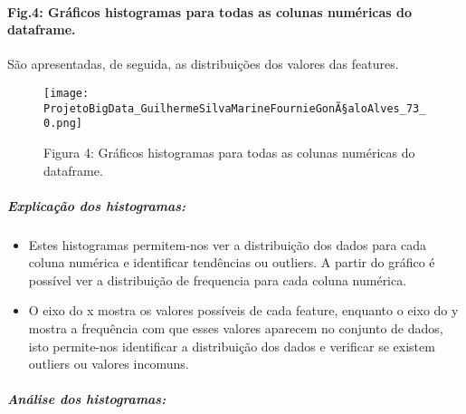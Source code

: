 \documentclass[11pt]{article}
\providecommand{\tightlist}{%
      \setlength{\itemsep}{0pt}\setlength{\parskip}{0pt}}
\begin{document}
\pagebreak

    \hypertarget{gruxe1ficos-histogramas-para-todas-as-colunas-numuxe9ricas-do-dataframe.}{%
\paragraph{Fig.4: Gráficos histogramas para todas as colunas numéricas do
dataframe.}\label{gruxe1ficos-histogramas-para-todas-as-colunas-numuxe9ricas-do-dataframe.}}

São apresentadas, de seguida, as distribuições dos valores das features.

\begin{figure}[h]
   \centering
   \texttt{[image: ProjetoBigData\_GuilhermeSilvaMarineFournieGonÃ§aloAlves\_73\_0.png]}
   \pagebreak
    \caption{Figura 4: Gráficos histogramas para todas as colunas numéricas do
dataframe.}
    \pagebreak
   \label{fig:histogramas}
\end{figure}
    
    \hypertarget{explicauxe7uxe3o-dos-histogramas}{%
\subparagraph{Explicação dos
histogramas:}\label{explicauxe7uxe3o-dos-histogramas}}

    \begin{itemize}
\tightlist
\item
  Estes histogramas permitem-nos ver a distribuição dos dados para cada
  coluna numérica e identificar tendências ou outliers. A partir do
  gráfico é possível ver a distribuição de frequencia para cada coluna
  numérica.
\item
  O eixo do x mostra os valores possíveis de cada feature, enquanto o
  eixo do y mostra a frequência com que esses valores aparecem no
  conjunto de dados, isto permite-nos identificar a distribuição dos
  dados e verificar se existem outliers ou valores incomuns.
\end{itemize}

    \hypertarget{anuxe1lise-dos-histogramas}{%
\subparagraph{Análise dos
histogramas:}\label{anuxe1lise-dos-histogramas}}
\end{document}
